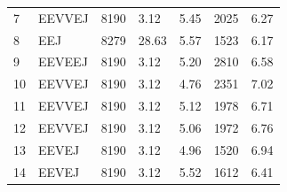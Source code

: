 \documentclass[letterpaper, preprint, paper,11pt]{AAS}	%
\begin{document}
\begin{table}[h!]
\begin{tabular}{lllllll}
        7                           & EEVVEJ                     & 8190                            & 3.12                                                   & 5.45                                                    & 2025                       & 6.27                                                             \\
        8                           & EEJ                        & 8279                            & 28.63                                                  & 5.57                                                    & 1523                       & 6.17                                                             \\
        \rowcolor{lightgray}9       & EEVEEJ                     & 8190                            & 3.12                                                   & 5.20                                                    & 2810                       & 6.58                                                             \\
        10                          & EEVVEJ                     & 8190                            & 3.12                                                   & 4.76                                                    & 2351                       & 7.02                                                             \\
        11                          & EEVVEJ                     & 8190                            & 3.12                                                   & 5.12                                                    & 1978                       & 6.71                                                             \\
        12                          & EEVVEJ                     & 8190                            & 3.12                                                   & 5.06                                                    & 1972                       & 6.76                                                             \\
        13                          & EEVEJ                      & 8190                            & 3.12                                                   & 4.96                                                    & 1520                       & 6.94                                                             \\
        14                          & EEVEJ                      & 8190                            & 3.12                                                   & 5.52                                                    & 1612                       & 6.41                                                             \\

\end{tabular}
\end{table}
\end{document}
